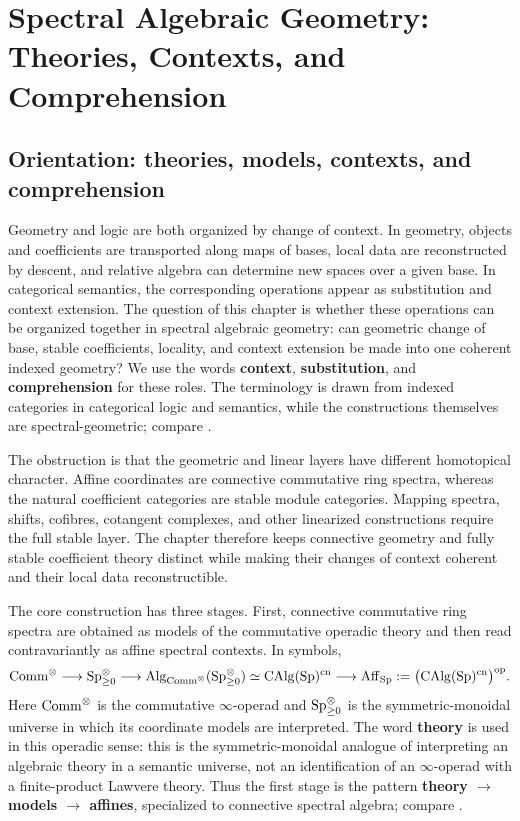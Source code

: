 \chapter{Spectral Algebraic Geometry: Theories, Contexts, and Comprehension}
\label{chap:spectral-algebraic-geometry}

\section{Orientation: theories, models, contexts, and comprehension}
\label{sec:spectral-ag-purpose}

Geometry and logic are both organized by change of context. In geometry,
objects and coefficients are transported along maps of bases, local data are
reconstructed by descent, and relative algebra can determine new spaces over a
given base. In categorical semantics, the corresponding operations appear as
substitution and context extension. The question of this chapter is whether
these operations can be organized together in spectral algebraic geometry:
can geometric change of base, stable coefficients, locality, and context
extension be made into one coherent indexed geometry? We use the words
\textbf{context}, \textbf{substitution}, and \textbf{comprehension} for these
roles. The terminology is drawn from indexed categories in categorical logic
and semantics, while the constructions themselves are spectral-geometric;
compare \cite{JacobsCategoricalLogic}.

The obstruction is that the geometric and linear layers have different
homotopical character. Affine coordinates are connective commutative ring
spectra, whereas the natural coefficient categories are stable module
categories. Mapping spectra, shifts, cofibres, cotangent complexes, and other
linearized constructions require the full stable layer. The chapter therefore
keeps connective geometry and fully stable coefficient theory distinct while
making their changes of context coherent and their local data reconstructible.

The core construction has three stages. First, connective commutative ring
spectra are obtained as models of the commutative operadic theory and then read
contravariantly as affine spectral contexts. In symbols,
\[
    \mathrm{Comm}^\otimes
    \longrightarrow
    \operatorname{Sp}_{\geq0}^\otimes
    \longrightarrow
    \operatorname{Alg}_{\mathrm{Comm}^\otimes}(\operatorname{Sp}_{\geq0}^\otimes)
    \simeq
    \operatorname{CAlg}(\operatorname{Sp})^{\mathrm{cn}}
    \longrightarrow
    \operatorname{Aff}_{\operatorname{Sp}}
    :=
    \bigl(\operatorname{CAlg}(\operatorname{Sp})^{\mathrm{cn}}\bigr)^{\mathrm{op}}.
\]
Here \(\mathrm{Comm}^\otimes\) is the commutative \(\infty\)-operad and
\(\operatorname{Sp}_{\geq0}^\otimes\) is the symmetric-monoidal universe in which its
coordinate models are interpreted. The word \textbf{theory} is used in this
operadic sense: this is the symmetric-monoidal analogue of interpreting an
algebraic theory in a semantic universe, not an identification of an
\(\infty\)-operad with a finite-product Lawvere theory. Thus the first stage
is the pattern \textbf{theory \(\to\) models \(\to\) affines}, specialized to
connective spectral algebra; compare
\cite{LurieHigherAlgebra,LurieSAG,KhanBraveNewMotivicI}.

